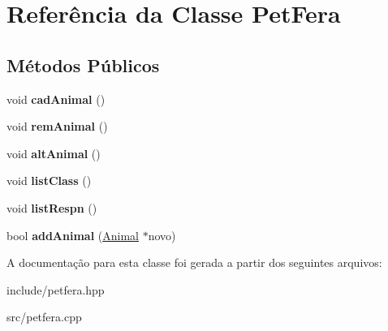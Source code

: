 \hypertarget{classPetFera}{}\section{Referência da Classe Pet\+Fera}
\label{classPetFera}
\subsection*{Métodos Públicos}
\begin{DoxyCompactItemize}
\item 
\mbox{\label{classPetFera_a5ba6438da07b3fbd4d3001f5abf40c67}} 
void {\bfseries cad\+Animal} ()
\item 
\mbox{\label{classPetFera_ab9a44d9cb270ba9a09bb2a28b96ca9ed}} 
void {\bfseries rem\+Animal} ()
\item 
\mbox{\label{classPetFera_aaf345645dfba2a1708c3fa0323f4d0df}} 
void {\bfseries alt\+Animal} ()
\item 
\mbox{\label{classPetFera_aae0ce5fef39f24927391bb2f6fa4507d}} 
void {\bfseries list\+Class} ()
\item 
\mbox{\label{classPetFera_a54125918fac61cbdea39700a7a8b2f27}} 
void {\bfseries list\+Respn} ()
\item 
\mbox{\label{classPetFera_ac81fbaa6dd89a2710d4d540ed263dffb}} 
bool {\bfseries add\+Animal} (\hyperlink{classAnimal}{Animal} $\ast$novo)
\end{DoxyCompactItemize}


A documentação para esta classe foi gerada a partir dos seguintes arquivos\+:\begin{DoxyCompactItemize}
\item 
include/petfera.\+hpp\item 
src/petfera.\+cpp\end{DoxyCompactItemize}
